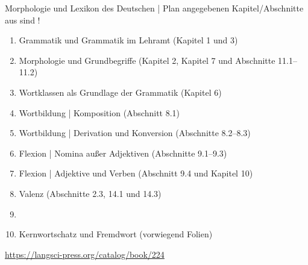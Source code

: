 \begin{frame}
  {Morphologie und Lexikon des Deutschen | Plan}
   angegebenen Kapitel\slash Abschnitte aus  sind !\\
  \Halbzeile
  \begin{enumerate}
    \item Grammatik und Grammatik im Lehramt (Kapitel 1 und 3)
    \item Morphologie und Grundbegriffe (Kapitel 2, Kapitel 7 und Abschnitte 11.1--11.2)
    \item Wortklassen als Grundlage der Grammatik (Kapitel 6)
    \item Wortbildung | Komposition (Abschnitt 8.1)
    \item Wortbildung | Derivation und Konversion (Abschnitte 8.2--8.3)
    \item Flexion | Nomina außer Adjektiven (Abschnitte 9.1--9.3)
    \item Flexion | Adjektive und Verben (Abschnitt 9.4 und Kapitel 10)
    \item Valenz (Abschnitte 2.3, 14.1 und 14.3)
    \item {}
    \item Kernwortschatz und Fremdwort (vorwiegend Folien)
  \end{enumerate}
  \Halbzeile
  \centering 
  \url{https://langsci-press.org/catalog/book/224}
\end{frame}



